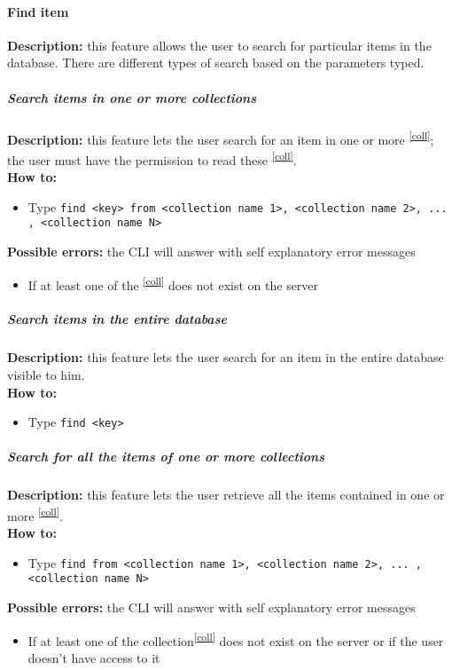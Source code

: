 \documentclass{scalatekids-article}
\begin{document}
\paragraph{Find item}
\label{sec:find}
\textbf{Description:} this feature allows the user to search for particular items in the database. There are different types of search based on the parameters typed.\\

\subparagraph{Search items in one or more collections}
\textbf{Description:} this feature lets the user search for an item in one or more \textsuperscript{\ref{coll}}; the user must have the permission to read these \textsuperscript{\ref{coll}}.\\
\textbf{How to:}
\begin{itemize}
\item Type \texttt{find <key> from <collection name 1>, <collection name 2>, ... , <collection name N>}
\end{itemize}
\textbf{Possible errors:} the CLI will answer with self explanatory error messages
\begin{itemize}
\item If at least one of the \textsuperscript{\ref{coll}} does not exist on the server
\end{itemize}

\subparagraph{Search items in the entire database}
\textbf{Description:} this feature lets the user search for an item in the entire database visible to him.\\
\textbf{How to:}
\begin{itemize}
\item Type \texttt{find <key>}
\end{itemize}

\subparagraph{Search for all the items of one or more collections}
\textbf{Description:} this feature lets the user retrieve all the items contained in one or more \textsuperscript{\ref{coll}}.\\
\textbf{How to:}
\begin{itemize}
\item Type \texttt{find from <collection name 1>, <collection name 2>, ... , <collection name N>}
\end{itemize}
\textbf{Possible errors:} the CLI will answer with self explanatory error messages
\begin{itemize}
\item If at least one of the collection\textsuperscript{\ref{coll}} does not exist on the server or if the user doesn't have access to it
\end{itemize}
\end{document}
